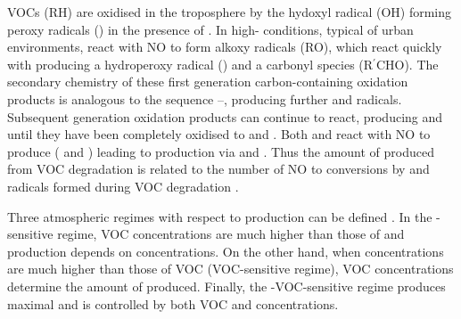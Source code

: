 VOCs (RH) are oxidised in the troposphere by the hydoxyl radical (OH) forming peroxy radicals () in the presence of  . 
In high- conditions, typical of urban environments,  react with NO  to form alkoxy radicals (RO), which react quickly with   producing a hydroperoxy radical () and a carbonyl species (R$^{\prime}$CHO).
The secondary chemistry of these first generation carbon-containing oxidation products is analogous to the sequence --, producing further  and  radicals.
Subsequent generation oxidation products can continue to react, producing  and  until they have been completely oxidised to  and .
Both  and  react with NO to produce  ( and ) leading to  production via  and . 
Thus the amount of  produced from VOC degradation is related to the number of NO to  conversions by  and  radicals formed during VOC degradation \citep{Atkinson:2000}.
\begin{reactionlist}
\end{reactionlist}

Three atmospheric regimes with respect to  production can be defined \citep{Jenkin:2000}. 
In the -sensitive regime, VOC concentrations are much higher than those of  and  production depends on  concentrations. 
On the other hand, when  concentrations are much higher than those of VOC (VOC-sensitive regime), VOC concentrations determine the amount of  produced.
Finally, the -VOC-sensitive regime produces maximal  and is controlled by both VOC and  concentrations.

